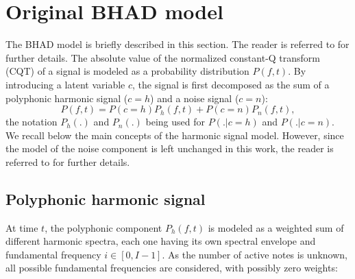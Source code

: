\documentclass{article}
\begin{document}
\vspace{0.3cm}

\section{Original BHAD model}
\label{sec:Bhad}
The BHAD model is briefly described in this section. The reader is referred to \cite{Fuentes2012_EUSIPCO} for further details.
The absolute value of the normalized constant-Q transform (CQT) of a signal is modeled as a probability distribution $P(f,t)$. By introducing a latent variable $c$, the signal is first decomposed as the sum of a polyphonic harmonic signal ($c=h$) and a noise signal ($c=n$):
\begin{equation}
P(f,t) = P(c=h)P_h(f,t)+P(c=n)P_n(f,t),
\end{equation}
the notation $P_h(.)$ and $P_n(.)$ being used for $P(.|c=h)$ and $P(.|c=n)$.  We recall below the main concepts of the harmonic signal model. However, since the model of the noise component is left unchanged in this work, the reader is referred to \cite{Fuentes2012_EUSIPCO} for further details.


 
\subsection{Polyphonic harmonic signal}
At time $t$, the polyphonic component $P_h(f,t)$ is modeled as a weighted sum of different harmonic spectra, each one having its own spectral envelope and fundamental frequency $i \in \left[ 0, I-1 \right]$. As the number of active notes is unknown, all possible fundamental frequencies are considered, with possibly zero weights:
\end{document}
